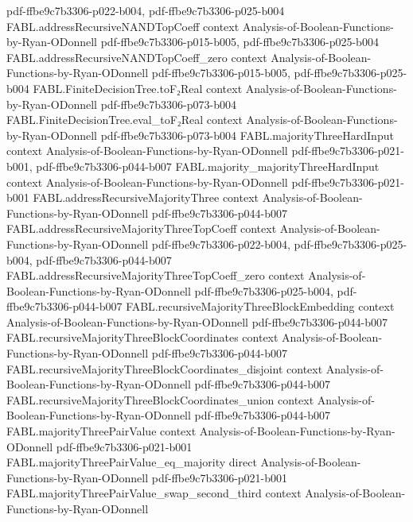 \begin{theorem}
  {pdf-ffbe9c7b3306-p022-b004,
    pdf-ffbe9c7b3306-p025-b004}
\proofstep
  {FABL.addressRecursiveNANDTopCoeff}
  {context}
  {Analysis-of-Boolean-Functions-by-Ryan-ODonnell}
  {pdf-ffbe9c7b3306-p015-b005,
    pdf-ffbe9c7b3306-p025-b004}
\proofstep
  {FABL.addressRecursiveNANDTopCoeff_zero}
  {context}
  {Analysis-of-Boolean-Functions-by-Ryan-ODonnell}
  {pdf-ffbe9c7b3306-p015-b005,
    pdf-ffbe9c7b3306-p025-b004}
\proofstep
  {FABL.FiniteDecisionTree.toF₂Real}
  {context}
  {Analysis-of-Boolean-Functions-by-Ryan-ODonnell}
  {pdf-ffbe9c7b3306-p073-b004}
\proofstep
  {FABL.FiniteDecisionTree.eval_toF₂Real}
  {context}
  {Analysis-of-Boolean-Functions-by-Ryan-ODonnell}
  {pdf-ffbe9c7b3306-p073-b004}
\proofstep
  {FABL.majorityThreeHardInput}
  {context}
  {Analysis-of-Boolean-Functions-by-Ryan-ODonnell}
  {pdf-ffbe9c7b3306-p021-b001,
    pdf-ffbe9c7b3306-p044-b007}
\proofstep
  {FABL.majority_majorityThreeHardInput}
  {context}
  {Analysis-of-Boolean-Functions-by-Ryan-ODonnell}
  {pdf-ffbe9c7b3306-p021-b001}
\proofstep
  {FABL.addressRecursiveMajorityThree}
  {context}
  {Analysis-of-Boolean-Functions-by-Ryan-ODonnell}
  {pdf-ffbe9c7b3306-p044-b007}
\proofstep
  {FABL.addressRecursiveMajorityThreeTopCoeff}
  {context}
  {Analysis-of-Boolean-Functions-by-Ryan-ODonnell}
  {pdf-ffbe9c7b3306-p022-b004,
    pdf-ffbe9c7b3306-p025-b004,
    pdf-ffbe9c7b3306-p044-b007}
\proofstep
  {FABL.addressRecursiveMajorityThreeTopCoeff_zero}
  {context}
  {Analysis-of-Boolean-Functions-by-Ryan-ODonnell}
  {pdf-ffbe9c7b3306-p025-b004,
    pdf-ffbe9c7b3306-p044-b007}
\proofstep
  {FABL.recursiveMajorityThreeBlockEmbedding}
  {context}
  {Analysis-of-Boolean-Functions-by-Ryan-ODonnell}
  {pdf-ffbe9c7b3306-p044-b007}
\proofstep
  {FABL.recursiveMajorityThreeBlockCoordinates}
  {context}
  {Analysis-of-Boolean-Functions-by-Ryan-ODonnell}
  {pdf-ffbe9c7b3306-p044-b007}
\proofstep
  {FABL.recursiveMajorityThreeBlockCoordinates_disjoint}
  {context}
  {Analysis-of-Boolean-Functions-by-Ryan-ODonnell}
  {pdf-ffbe9c7b3306-p044-b007}
\proofstep
  {FABL.recursiveMajorityThreeBlockCoordinates_union}
  {context}
  {Analysis-of-Boolean-Functions-by-Ryan-ODonnell}
  {pdf-ffbe9c7b3306-p044-b007}
\proofstep
  {FABL.majorityThreePairValue}
  {context}
  {Analysis-of-Boolean-Functions-by-Ryan-ODonnell}
  {pdf-ffbe9c7b3306-p021-b001}
\proofstep
  {FABL.majorityThreePairValue_eq_majority}
  {direct}
  {Analysis-of-Boolean-Functions-by-Ryan-ODonnell}
  {pdf-ffbe9c7b3306-p021-b001}
\proofstep
  {FABL.majorityThreePairValue_swap_second_third}
  {context}
  {Analysis-of-Boolean-Functions-by-Ryan-ODonnell}

\end{theorem}
